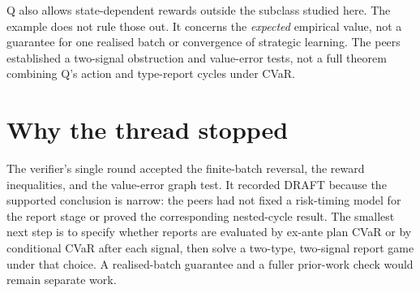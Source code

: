 \documentclass{article}
\begin{document}
Q also allows state-dependent rewards outside the subclass studied here. The example does not rule those out.
It concerns the \emph{expected} empirical value, not a guarantee for one realised batch or convergence of
strategic learning. The peers established a two-signal obstruction and value-error tests, not a full theorem
combining Q's action and type-report cycles under CVaR.

\section{Why the thread stopped}

The verifier's single round accepted the finite-batch reversal, the reward inequalities, and the value-error
graph test. It recorded DRAFT because the supported conclusion is narrow: the peers had not fixed a
risk-timing model for the report stage or proved the corresponding nested-cycle result. The smallest next step
is to specify whether reports are evaluated by ex-ante plan CVaR or by conditional CVaR after each signal,
then solve a two-type, two-signal report game under that choice. A realised-batch guarantee and a fuller
prior-work check would remain separate work.



\end{document}
